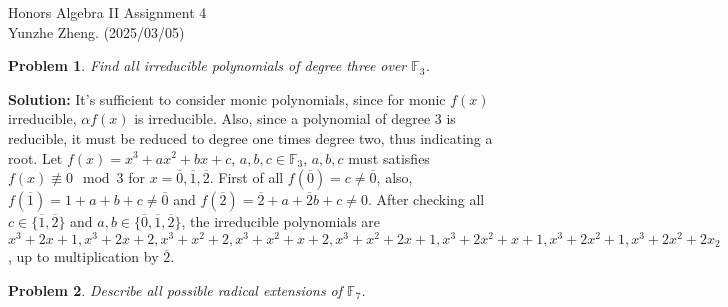 \documentclass[12pt]{article}
\newtheorem{problem}{Problem}
\begin{document}
\noindent Honors Algebra II \hfill Assignment 4\\
Yunzhe Zheng. (2025/03/05)

\hrulefill

\begin{problem}
Find all irreducible polynomials of degree three over $\mathbb{F}_{3}$.         
\end{problem}

\textbf{Solution:} It's sufficient to consider monic polynomials, since for monic $f(x)$ irreducible, $\alpha f(x)$ is irreducible. Also, since a polynomial of degree $3$ is reducible, it must be reduced to degree one times degree two, thus indicating a root. Let $f(x)=x^{3}+ax^{2}+bx+c$, $a,b,c\in\mathbb{F}_{3}$, $a,b,c$ must satisfies $f(x)\not\equiv 0\mod 3$ for $x=\overline{0}, \overline{1},\overline{2}$. First of all $f(\overline{0})=c\neq \overline{0}$, also, $f(\overline{1})=1+a+b+c\neq\overline{0}$ and $f(\overline{2})=\overline{2}+a+\overline{2}b+c\neq 0$. After checking all $c\in\{\overline{1},\overline{2}\}$ and $a,b\in\{\overline{0}, \overline{1}, \overline{2}\}$, the irreducible polynomials are $x^3+2x+1, x^3+2x+2, x^3+x^2+2, x^3+x^2+x+2, x^3+x^2+2x+1, x^3+2x^2+x+1, x^3+2x^2+1, x^3+2x^2+2x_2$, up to multiplication by $\overline{2}$. 

\begin{problem}
Describe all possible radical extensions of $\mathbb{F}_{7}$.
\end{problem}
\end{document}
